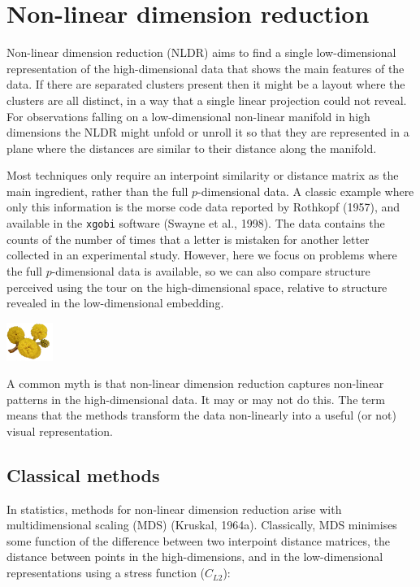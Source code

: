 \documentclass[
  letterpaper,
]{krantz}
\newcommand{\infobox}[1]{%
\noindent\colorbox{info!30}{%
\begin{minipage}{0.98\linewidth}%
    \centering%
    \begin{minipage}[c]{0.15\linewidth} %
      \includegraphics[width=1.5cm]{images/mulga-flowers2.png} %
    \end{minipage}%
    \hfill %
    \begin{minipage}[c]{0.8\linewidth} %
      \bigskip%
      \textsf{#1}%
      \bigskip%
    \end{minipage}%
    \hspace*{3mm}%
  \end{minipage}%
}%
}
\begin{document}
\chapter{Non-linear dimension
reduction}\label{non-linear-dimension-reduction}

Non-linear dimension reduction (NLDR) aims to find a single
low-dimensional representation of the high-dimensional data that shows
the main features of the data. If there are separated clusters present
then it might be a layout where the clusters are all distinct, in a way
that a single linear projection could not reveal. For observations
falling on a low-dimensional non-linear manifold in high dimensions the
NLDR might unfold or unroll it so that they are represented in a plane
where the distances are similar to their distance along the manifold.

 

Most techniques only require an interpoint similarity or distance matrix
as the main ingredient, rather than the full \(p\)-dimensional data. A
classic example where only this information is the morse code data
reported by Rothkopf (1957), and available in the \texttt{xgobi}
software (Swayne et al., 1998). The data contains the counts of the
number of times that a letter is mistaken for another letter collected
in an experimental study. However, here we focus on problems where the
full \(p\)-dimensional data is available, so we can also compare
structure perceived using the tour on the high-dimensional space,
relative to structure revealed in the low-dimensional embedding.

\infobox{A common myth is that non-linear dimension reduction captures non-linear patterns in the high-dimensional data. It may or may not do this. The term means that the methods transform the data non-linearly into a useful (or not) visual representation.}

\section{Classical methods}\label{classical-methods}

In statistics, methods for non-linear dimension reduction arise with
multidimensional scaling (MDS) (Kruskal, 1964a). Classically, MDS
minimises some function of the difference between two interpoint
distance matrices, the distance between points in the high-dimensions,
and in the low-dimensional representations using a stress function
(\(C_{L2}\)):
\end{document}
